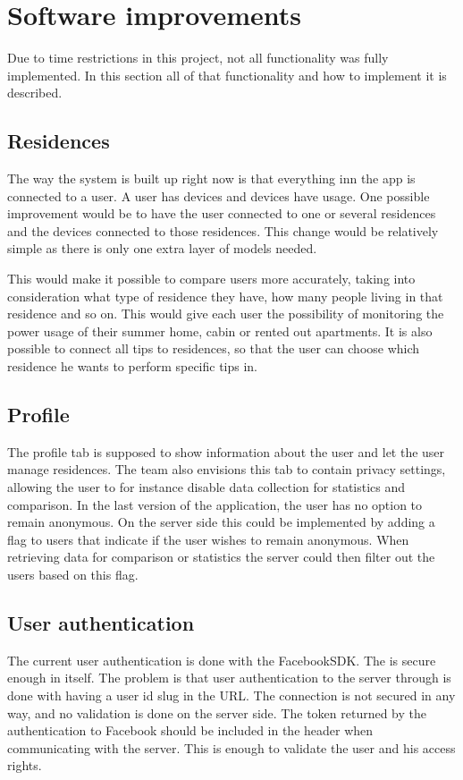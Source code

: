 \section{Software improvements}
Due to time restrictions in this project, not all functionality was fully implemented. In this section all of that functionality and how to implement it is described. 

\subsection{Residences}
The way the system is built up right now is that everything inn the app is connected to a user. A user has devices and devices have usage. One possible improvement would be to have the user connected to one or several residences and the devices connected to those residences. This change would be relatively simple as there is only one extra layer of models needed.

This would make it possible to compare users more accurately, taking into consideration what type of residence they have, how many people living in that residence and so on. This would give each user the possibility of monitoring the power usage of their summer home, cabin or rented out apartments. It is also possible to connect all tips to residences, so that the user can choose which residence he wants to perform specific tips in. 

\subsection{Profile}
The profile tab is supposed to show information about the user and let the user manage residences. The team also envisions this tab to contain privacy settings, allowing the user to for instance disable data collection for statistics and comparison. In the last version of the application, the user has no option to remain anonymous. 
On the server side this could be implemented by adding a flag to users that indicate if the user wishes to remain anonymous. When retrieving data for comparison or statistics the server could then filter out the users based on this flag.

\subsection{User authentication}
The current user authentication is done with the FacebookSDK. The is secure enough in itself. 
The problem is that user authentication to the server through is done with having a user id slug in the URL. The connection is not secured in any way, and no validation is done on the server side.
The token returned by the authentication to Facebook should be included in the header when communicating with the server. This is enough to validate the user and his access rights.

